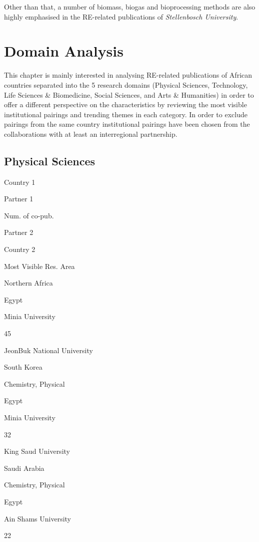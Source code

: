 \documentclass[12pt,twoside]{report}
\begin{document}
Other than that, a number of biomass, biogas and bioprocessing methods are also highly emphasised in the RE-related publications of \emph{Stellenbosch University}.

\hypertarget{domain-analysis}{%
\section{Domain Analysis}\label{domain-analysis}}

This chapter is mainly interested in analysing RE-related publications of African countries separated into the 5 research domains (Physical Sciences, Technology, Life Sciences \& Biomedicine, Social Sciences, and Arts \& Humanities) in order to offer a different perspective on the characteristics by reviewing the most visible institutional pairings and trending themes in each category. In order to exclude pairings from the same country institutional pairings have been chosen from the collaborations with at least an interregional partnership.

\hypertarget{physical-sciences}{%
\subsection{Physical Sciences}\label{physical-sciences}}

Country 1

Partner 1

Num. of co-pub.

Partner 2

Country 2

Most Visible Res. Area

Northern Africa

{Egypt }

{Minia University }

{45}

{JeonBuk National University }

{South Korea }

{Chemistry, Physical }

{Egypt }

{Minia University }

{32}

{King Saud University }

{Saudi Arabia }

{Chemistry, Physical }

{Egypt }

{Ain Shams University }

{22}
\end{document}

